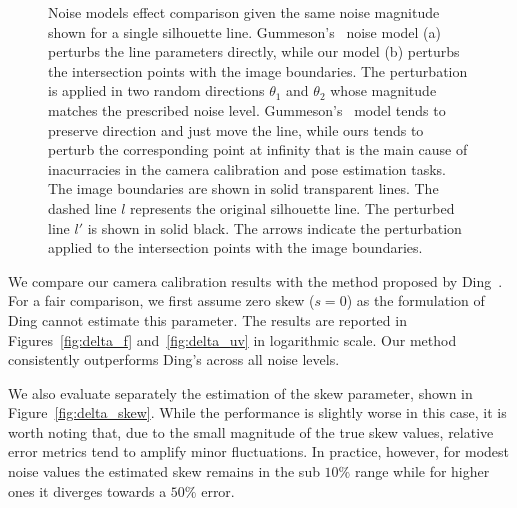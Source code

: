 \begin{figure}
{
    }
    \hfill

    \caption{Noise models effect comparison given the same noise magnitude shown for a single silhouette line. Gummeson's~\cite{gummeson22pose} noise model (a) perturbs the line parameters directly, while our model (b) perturbs the intersection points with the image boundaries. The perturbation is applied in two random directions $\theta_1$ and $\theta_2$ whose magnitude matches the prescribed noise level.
    Gummeson's~\cite{gummeson22pose} model tends to preserve direction and just move the line, while ours tends to perturb the corresponding point at infinity that is the main cause of inacurracies in the camera calibration and pose estimation tasks.
    The image boundaries are shown in solid transparent lines. The dashed line $l$ represents the original silhouette line. The perturbed line $l'$ is shown in solid black. The arrows indicate the perturbation applied to the intersection points with the image boundaries.}
    \label{fig:noise_model}
    
\end{figure}

We compare our camera calibration results with the method proposed by Ding~\cite{CalibrationFreePlacedRightCylinder}. For a fair comparison, we first assume zero skew ($s = 0$) as the formulation of Ding cannot  estimate this parameter. The results are reported in Figures~\ref{fig:delta_f} and~\ref{fig:delta_uv} in logarithmic scale. Our method consistently outperforms Ding's across all noise levels.

We also evaluate separately the estimation of the skew parameter, shown in Figure~\ref{fig:delta_skew}. While the performance is slightly worse in this case, it is worth noting that, due to the small magnitude of the true skew values, relative error metrics tend to amplify minor fluctuations. In practice, however, for modest noise values the estimated skew remains in the sub $10\%$ range while for higher ones it diverges towards a $50\%$ error.

